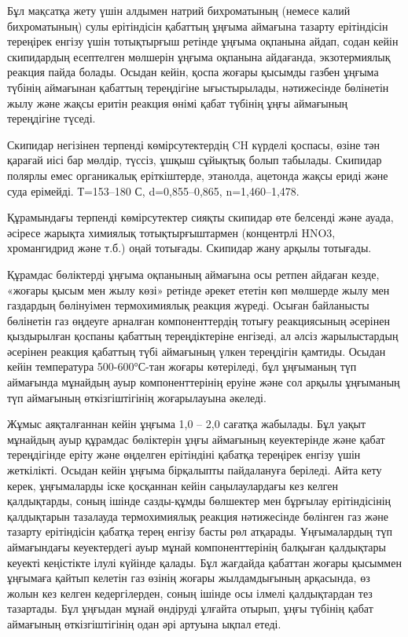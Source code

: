 \begin{multicols}{2}
Бұл мақсатқа жету үшін алдымен натрий бихроматының (немесе калий
бихроматының) сулы ерітіндісін қабаттың ұңғыма аймағына тазарту
ерітіндісін тереңірек енгізу үшін тотықтырғыш ретінде ұңғыма оқпанына
айдап, содан кейін скипидардың есептелген мөлшерін ұңғыма оқпанына
айдағанда, экзотермиялық реакция пайда болады. Осыдан кейін, қоспа
жоғары қысымды газбен ұңғыма түбінің аймағынан қабаттың тереңдігіне
ығыстырылады, нәтижесінде бөлінетін жылу және жақсы еритін реакция өнімі
қабат түбінің ұңғы аймағының тереңдігіне түседі.

Скипидар негізінен терпенді көмірсутектердің
CH күрделі қоспасы, өзіне тән
қарағай иісі бар мөлдір, түссіз, ұшқыш сұйықтық болып табылады. Скипидар
полярлы емес органикалық еріткіштерде, этанолда, ацетонда жақсы ериді
және суда ерімейді. Т=153--180 С,
d=0,855--0,865,
n=1,460--1,478.

Құрамындағы терпенді көмірсутектер сияқты скипидар өте белсенді және
ауада, әсіресе жарықта химиялық тотықтырғыштармен (концентрлі HNO3,
хромангидрид және т.б.) оңай тотығады. Скипидар жану арқылы тотығады.

Құрамдас бөліктерді ұңғыма оқпанының аймағына осы ретпен айдаған кезде,
«жоғары қысым мен жылу көзі» ретінде әрекет ететін көп мөлшерде жылу мен
газдардың бөлінуімен термохимиялық реакция жүреді. Осыған байланысты
бөлінетін газ өңдеуге арналған компоненттердің тотығу реакциясының
әсерінен қыздырылған қоспаны қабаттың тереңдіктеріне енгізеді, ал әлсіз
жарылыстардың әсерінен реакция қабаттың түбі аймағының үлкен тереңдігін
қамтиды. Осыдан кейін температура 500-600°С-тан жоғары көтеріледі, бұл
ұңғыманың түп аймағында мұнайдың ауыр компоненттерінің еруіне және сол
арқылы ұңғыманың түп аймағының өткізгіштігінің жоғарылауына әкеледі.

Жұмыс аяқталғаннан кейін ұңғыма 1,0 -- 2,0 сағатқа жабылады. Бұл уақыт
мұнайдың ауыр құрамдас бөліктерін ұңғы аймағының кеуектерінде және қабат
тереңдігінде еріту және өңделген ерітіндіні қабатқа тереңірек енгізу
үшін жеткілікті. Осыдан кейін ұңғыма бірқалыпты пайдалануға беріледі.
Айта кету керек, ұңғымаларды іске қосқаннан кейін саңылаулардағы кез
келген қалдықтарды, соның ішінде сазды-құмды бөлшектер мен бұрғылау
ерітіндісінің қалдықтарын тазалауда термохимиялық реакция нәтижесінде
бөлінген газ және тазарту ерітіндісін қабатқа терең енгізу басты рөл
атқарады. Ұңғымалардың түп аймағындағы кеуектердегі ауыр мұнай
компоненттерінің балқыған қалдықтары кеуекті кеңістікте ілулі күйінде
қалады. Бұл жағдайда қабаттан жоғары қысыммен ұңғымаға қайтып келетін
газ өзінің жоғары жылдамдығының арқасында, өз жолын кез келген
кедергілерден, соның ішінде осы ілмелі қалдықтардан тез тазартады. Бұл
ұңғыдан мұнай өндіруді ұлғайта отырып, ұңғы түбінің қабат аймағының
өткізгіштігінің одан әрі артуына ықпал етеді.


\end{multicols}
